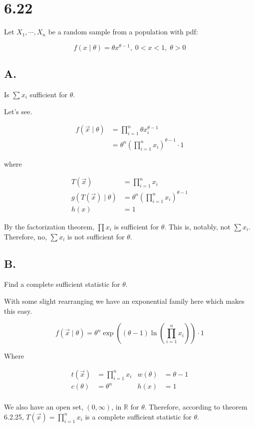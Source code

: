 \section*{6.22}

Let $X_1, \cdots, X_n$ be a random sample from a population with pdf:

\[f(x \mid \theta) = \theta x^{\theta - 1}, \; 0 < x < 1, \; \theta > 0\]

\subsection*{A.}

Is $\sum x_i$ sufficient for $\theta$. 

\noindent Let's see.

\vspace{-3mm}
\begin{align*}
	f(\vec{x} \mid \theta) &= \prod_{i=1}^n \theta x_i^{\theta - 1} \\
	&= \theta^n \left( \prod_{i=1}^n x_i \right)^{\theta - 1} \cdot 1
\end{align*}

where

\vspace{-3mm}
\begin{align*}
	T(\vec{x}) &= \prod_{i=1}^n x_i \\
	g(T(\vec{x}) \mid \theta) &=  \theta^n \left( \prod_{i=1}^n x_i \right)^{\theta - 1} \\
	h(x) &= 1
\end{align*}

By the factorization theorem, $\prod x_i$ is sufficient for $\theta$. This is, notably, not $\sum x_i$. Therefore, no, $\sum x_i$ is not sufficient for $\theta$. 

\subsection*{B.}

Find a complete sufficient statistic for $\theta$. 

With some slight rearranging we have an exponential family here which makes this easy.

\[
	f(\vec{x} \mid \theta) = \theta^n \exp\left( (\theta - 1) \ln\left( \prod_{i=1}^n x_i \right) \right) \cdot 1
\]

Where

\vspace{-5mm}
\begin{align*}
	t(\vec{x}) &= \prod_{i=1}^n x_i & w(\theta) &= \theta - 1 \\
	c(\theta) &= \theta^n & h(x) &= 1 \\
\end{align*}

We also have an open set, $(0, \infty)$, in $\mathbb{R}$ for $\theta$. Therefore, according to theorem 6.2.25, $T(\vec{x}) = \prod_{i=1}^n x_i$ is a complete sufficient statistic for $\theta$.
